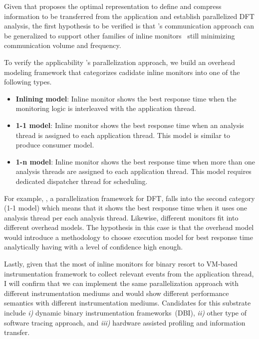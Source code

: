 %
%
Given that \sreplica proposes the optimal representation to define and compress
information to be transferred from the application and establish parallelized
DFT analysis, the first hypothesis to be verified is that \sreplica's
communication approach can be generalized to support other families of inline
monitors~\cite{CAB} still minimizing communication volume and
frequency.

To verify the applicability \sreplica's parallelization approach, we build an
overhead modeling framework that categorizes cadidate inline monitors into one
of the following types.

\begin{itemize}

    \item {\bf Inlining model}: Inline monitor shows the best response time
            when the monitoring logic is interleaved with the application
            thread.

    \item {\bf 1-1 model}: Inline monitor shows the best response time when an
            analysis thread is assigned to each application thread. This model
            is similar to produce consumer model.

    \item {\bf 1-n model}: Inline monitor shows the best response time when
            more than one analysis threads are assigned to each application
            thread.  This model requires dedicated dispatcher thread for
            scheduling.
    \end{itemize}

For example, \sreplica, a parallelization framework for DFT,  falls into the
second category (1-1 model) which means that it shows the best response time
when it uses one analysis thread per each analysis thread. Likewise, different
monitors fit into different overhead models. The hypothesis in this case is
that the overhead model would introduce a methodology to choose execution model
for best response time analytically having with a level of confidence high
enough.
 
Lastly, given that the most of inline monitors for binary resort to VM-based
instrumentation framework to collect relevant events from the application
thread, I will confirm that we can implement the same parallelization approach
with different instrumentation mediums and would show different performance
semantics with different instrumentation mediums. Candidates for this substrate
include {\it i)} dynamic binary instrumentation frameworks~(DBI), {\it ii)}
other type of software tracing approach, and {\it iii)} hardware assisted
profiling and information transfer.


